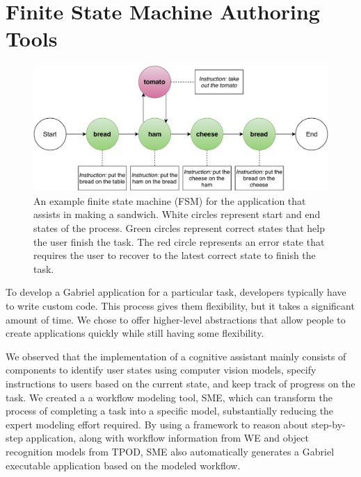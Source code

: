 \section{Finite State Machine Authoring Tools}
\label{sec: app-dev-statemachine}

\begin{figure}[t]
    \includegraphics[width=\linewidth]{FIGS/state_transition_4.pdf}
    \caption{An example finite state machine (FSM) for the application that assists in making a sandwich. White circles represent start and end states of the process. Green circles represent correct states that help the user finish the task. The red circle represents an error state that requires the user to recover to the latest correct state to finish the task.}
    \label{fig:sme}
\end{figure}

To develop a Gabriel application for a particular task, developers typically
have to write custom code. This process gives them flexibility, but it takes a
significant amount of time. We chose to offer higher-level abstractions that
allow people to create applications quickly while still having some flexibility.

We observed that the implementation of a cognitive assistant mainly consists of
components to identify user states using computer vision models, specify
instructions to users based on the current state, and keep track of progress on
the task. We created a a workflow modeling tool, SME, which can transform the
process of completing a task into a specific model, substantially reducing the
expert modeling effort required. By using a framework to reason about
step-by-step application, along with workflow information from WE and object
recognition models from TPOD, SME also automatically generates a Gabriel
executable application based on the modeled workflow.

